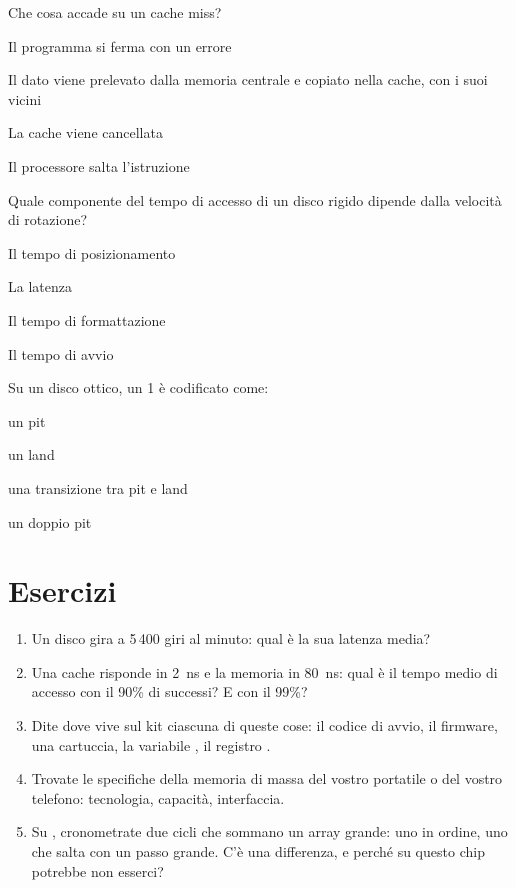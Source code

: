\begin{quiz}{Che cosa accade su un cache miss?}
\item Il programma si ferma con un errore
\item Il dato viene prelevato dalla memoria centrale e copiato nella cache, con i suoi vicini
\item La cache viene cancellata
\item Il processore salta l'istruzione
\end{quiz}

\begin{quiz}{Quale componente del tempo di accesso di un disco rigido dipende dalla velocità di rotazione?}
\item Il tempo di posizionamento
\item La latenza
\item Il tempo di formattazione
\item Il tempo di avvio
\end{quiz}

\begin{quiz}{Su un disco ottico, un 1 è codificato come:}
\item un pit
\item un land
\item una transizione tra pit e land
\item un doppio pit
\end{quiz}

\section{Esercizi}

\begin{exercise}
\begin{enumerate}[nosep]
\item Un disco gira a 5\,400 giri al minuto: qual è la sua latenza media?
\item Una cache risponde in 2~ns e la memoria in 80~ns: qual è il tempo medio
  di accesso con il 90\% di successi? E con il 99\%?
\item Dite dove vive sul kit \prg ciascuna di queste cose: il codice di avvio,
  il firmware, una cartuccia, la variabile , il registro
  .
\item Trovate le specifiche della memoria di massa del vostro portatile o del
  vostro telefono: tecnologia, capacità, interfaccia.
\item Su \prg, cronometrate due cicli che sommano un array grande: uno in
  ordine, uno che salta con un passo grande. C'è una differenza, e perché su
  questo chip potrebbe non esserci?
\end{enumerate}
\end{exercise}

